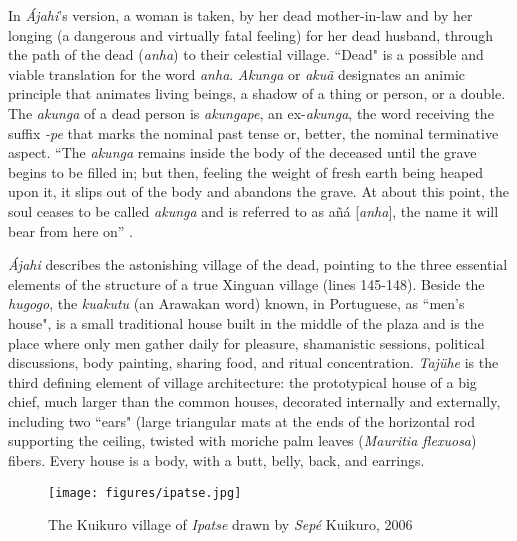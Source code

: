 \documentclass[output=paper,
modfonts,nonflat
]{langsci/langscibook}
\begin{document}
	In \emph{Ájahi}’s version, a woman is taken, by her dead mother-in-law and by her longing (a dangerous and virtually fatal feeling) for her dead husband, through the path of the dead (\emph{anha}) to their celestial village. “Dead" is a possible and viable translation for the word \emph{anha}. \emph{Akunga} or \emph{akuã} designates an animic principle that animates living beings, a shadow of a thing or person, or a double. The \emph{akunga} of a dead person is \emph{akungape}, an ex-\emph{akunga},  the word receiving the suffix \emph{-pe} that marks the nominal past tense or, better, the nominal terminative aspect. “The \emph{akunga} remains inside the body of the deceased until the grave begins to be filled in; but then, feeling the weight of fresh earth being heaped upon it, it slips out of the body and abandons the grave. At about this point, the soul ceases to be called \emph{akunga} and is referred to as añá [\emph{anha}], the name it will bear from here on” \citep[3]{Carneiro1977}.

 \emph{Ájahi} describes  the astonishing village of the dead, pointing to the three essential elements of the structure of a true Xinguan village (lines 145-148). Beside the \emph{hugogo}, the \emph{kuakutu} (an Arawakan word) known, in Portuguese, as “men’s house", is a small traditional house built in the middle of the plaza and is the place where only men gather daily for pleasure, shamanistic sessions, political discussions, body painting, sharing food, and ritual concentration. \emph{Tajühe} is the third defining element of village architecture: the prototypical house of a big chief, much larger than the common houses, decorated internally and externally, including two “ears" (large triangular mats at the ends of the horizontal rod supporting the ceiling, twisted with moriche palm leaves (\emph{Mauritia flexuosa}) fibers. Every house is a body, with a butt, belly, back, and earrings.

\begin{figure}[h!]
  \caption{The Kuikuro village of \emph{Ipatse} drawn by \emph{Sepé} Kuikuro, 2006} 
  \centering
\texttt{[image: figures/ipatse.jpg]}
\end{figure}
\end{document}
